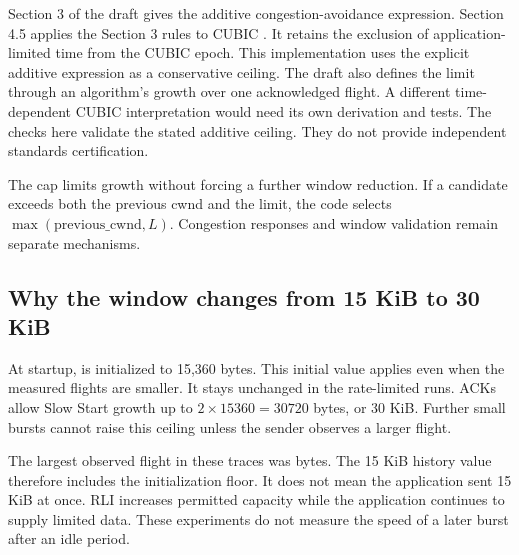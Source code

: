\documentclass[11pt,a4paper]{article}
\newcommand{\code}[1]{\texttt{\detokenize{#1}}}
\begin{document}
Section 3 of the draft gives the additive congestion-avoidance expression.
Section 4.5 applies the Section 3 rules to CUBIC \cite{rli}.
It retains the exclusion of application-limited time from the CUBIC epoch.
This implementation uses the explicit additive expression as a conservative ceiling.
The draft also defines the limit through an algorithm's growth over one acknowledged flight.
A different time-dependent CUBIC interpretation would need its own derivation and tests.
The checks here validate the stated additive ceiling.
They do not provide independent standards certification.

The cap limits growth without forcing a further window reduction.
If a candidate exceeds both the previous cwnd and the limit, the code selects \(\max(\mathrm{previous\_cwnd},L)\).
Congestion responses and window validation remain separate mechanisms.

\subsection{Why the window changes from 15 KiB to 30 KiB}
At startup, \code{maxFS} is initialized to 15,360 bytes.
This initial value applies even when the measured flights are smaller.
It stays unchanged in the rate-limited runs.
ACKs allow Slow Start growth up to \(2\times15360=30720\) bytes, or 30 KiB.
Further small bursts cannot raise this ceiling unless the sender observes a larger flight.

The largest observed flight in these traces was \ObservedRateFlight{} bytes.
The 15 KiB history value therefore includes the initialization floor.
It does not mean the application sent 15 KiB at once.
RLI increases permitted capacity while the application continues to supply limited data.
These experiments do not measure the speed of a later burst after an idle period.
\end{document}
